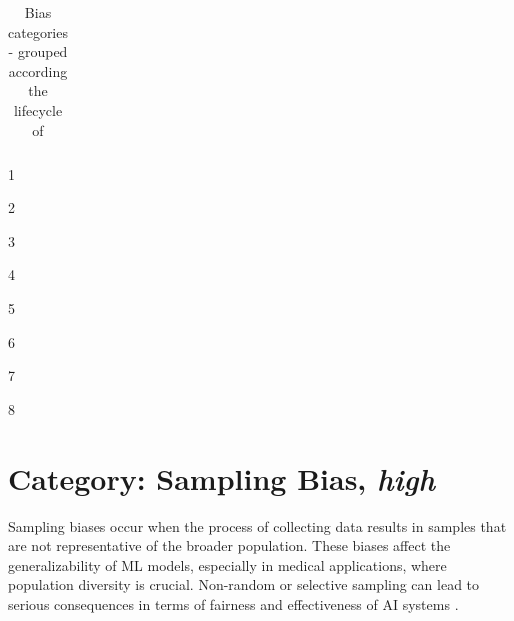 \documentclass[12pt, a4paper, oneside]{book}   	%
\newcommand{\tblWidthDescription}{\hsize=0.6\hsize\raggedright}
\newcommand{\tblWidthContext}{\hsize=0.18\hsize}
\begin{document}
\begin{appendices}
\begin{table}[H]
\begin{threeparttable}
\begin{tabularx}{\textwidth}{>{\tblWidthDescription}X|>{\tblWidthContext}X|>{\tblWidthContext}X}
					\bottomrule
				\end{tabularx}
				\begin{tablenotes}
					\footnotesize
					\begin{minipage}{0.33\textwidth}\raggedright
						\item[1] \autocite{Mehrabi_2021}
						\item[2] \autocite{HP_2022}
						\item[3] \autocites{Mester_2022}
					\end{minipage}%
					\begin{minipage}{0.33\textwidth}\raggedright
						\item[4] \autocite{Chakraborty_2024}
						\item[5] \autocite{Young_2020}
						\item[6] \autocite{Montoya_2025}
					\end{minipage}%
					\begin{minipage}{0.33\textwidth}\raggedright
						\item[7] \autocites{Mester_2017}
						\item[8] \autocite{Delgado-Rodriguez_2004}
					\end{minipage}%
				\end{tablenotes}
			\end{threeparttable}
			\caption{Bias categories - grouped according the  lifecycle of \textcite{Mehrabi_2021}}
			\label{tab:biases_types_appendix}
		\end{table}
		
		
		\section{Category: Sampling Bias, \textit{high}} \label{app:biasCategorySamplingBiasHigh}
		Sampling biases occur when the process of collecting data results in samples that are not representative of the broader population. These biases affect the generalizability of \gls{ML} models, especially in medical applications, where population diversity is crucial. Non-random or selective sampling can lead to serious consequences in terms of fairness and effectiveness of \gls{AI} systems \autocite{Mehrabi_2021, HP_2022}.
		

\end{appendices}
\end{document}
